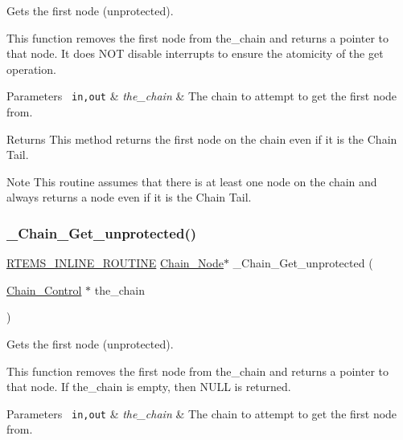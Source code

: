 Gets the first node (unprotected). 

This function removes the first node from the\+\_\+chain and returns a pointer to that node. It does N\+OT disable interrupts to ensure the atomicity of the get operation.


\begin{DoxyParams}[1]{Parameters}
\mbox{\texttt{ in,out}}  & {\em the\+\_\+chain} & The chain to attempt to get the first node from.\\
\hline
\end{DoxyParams}
\begin{DoxyReturn}{Returns}
This method returns the first node on the chain even if it is the Chain Tail.
\end{DoxyReturn}
\begin{DoxyNote}{Note}
This routine assumes that there is at least one node on the chain and always returns a node even if it is the Chain Tail. 
\end{DoxyNote}
\mbox{\label{group__RTEMSScoreChain_gac5bb79fd8e5b468790918a8e674a5d36}} 
\subsubsection{\texorpdfstring{\_Chain\_Get\_unprotected()}{\_Chain\_Get\_unprotected()}}
{\footnotesize\ttfamily \mbox{\hyperlink{group__RTEMSScoreBaseDefs_gac216239df231d5dbd15e3520b0b9313f}{R\+T\+E\+M\+S\+\_\+\+I\+N\+L\+I\+N\+E\+\_\+\+R\+O\+U\+T\+I\+NE}} \mbox{\hyperlink{group__RTEMSScoreChain_ga0dd4bfcca1ac7f90de2842e447846d3d}{Chain\+\_\+\+Node}}$\ast$ \+\_\+\+Chain\+\_\+\+Get\+\_\+unprotected (\begin{DoxyParamCaption}\item[{\mbox{\hyperlink{unionChain__Control}{Chain\+\_\+\+Control}} $\ast$}]{the\+\_\+chain }\end{DoxyParamCaption})}



Gets the first node (unprotected). 

This function removes the first node from the\+\_\+chain and returns a pointer to that node. If the\+\_\+chain is empty, then N\+U\+LL is returned.


\begin{DoxyParams}[1]{Parameters}
\mbox{\texttt{ in,out}}  & {\em the\+\_\+chain} & The chain to attempt to get the first node from.\\
\hline
\end{DoxyParams}

